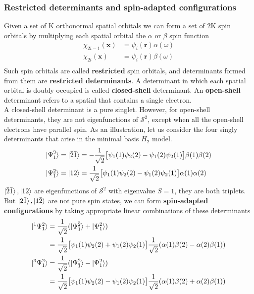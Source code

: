 \documentclass[11pt]{article}
\begin{document}
\subsubsection{Restricted determinants and spin-adapted configurations}
Given a set of K orthonormal spatial orbitals we can form a set of 2K spin orbitals by multiplying each spatial orbital the
$\alpha$ or $\beta$ spin function
\begin{equation}
    \begin{split}
        \chi_{2i-1}(\mathbf{x})&=\psi_i(\mathbf{r})\alpha(\omega)\\
        \chi_{2i}(\mathbf{x})&=\psi_i(\mathbf{r})\beta(\omega)\\
    \end{split}
\end{equation}
Such spin orbitals are called \textbf{restricted} spin orbitals, and determinants formed from them are \textbf{restricted determinants}.
A determinant in which each spatial orbital is doubly occupied is called \textbf{closed-shell} determinant. An \textbf{open-shell} determinant
refers to a spatial that contains a single electron.\\
A closed-shell determinant is a pure singlet. However, for open-shell determinants, they are not eigenfunctions of $\mathcal{S}^2$, except
when all the open-shell electrons have parallel spin. As an illustration, let us consider the four singly determinants that arise in the minimal
basis $H_2$ model.
\begin{align}
    \ket{\Psi_1^{\bar{2}}}&=\ket{\bar{2}\bar{1}}=-\frac{1}{\sqrt{2}}\big[\psi_1(1)\psi_2(2)-\psi_1(2)\psi_2(1)\big]\beta(1)\beta(2)\\
    \ket{\Psi_{\bar{1}}^2}&=\ket{1 2}=\frac{1}{\sqrt{2}}\big[\psi_1(1)\psi_2(2)-\psi_1(2)\psi_2(1)\big]\alpha(1)\alpha(2)\\
\end{align}
$\ket{\bar{2}\bar{1}}, \ket{1 2}$ are eigenfunctions of $\mathcal{S}^2$ with eigenvalue $S=1$, they are both triplets. But $\ket{2 \bar{1}}, \ket{1 \bar{2}}$
are not pure spin states, we can form \textbf{spin-adapted configurations} by taking appropriate linear combinations of these determinants
\begin{align}
    \ket{ ^1\Psi_1^2}&=\frac{1}{\sqrt{2}}(\ket{\Psi_{\bar{1}}^{\bar{2}}}+\ket{\Psi_1^2})\notag\\
    &=\frac{1}{\sqrt{2}}\big[\psi_1(1)\psi_2(2)+\psi_1(2)\psi_2(1)\big]\frac{1}{\sqrt{2}}(\alpha(1)\beta(2)-\alpha(2)\beta(1))\\
    \ket{ ^3\Psi_1^2}&=\frac{1}{\sqrt{2}}(\ket{\Psi_{\bar{1}}^{\bar{2}}}-\ket{\Psi_1^2})\notag\\
    &=\frac{1}{\sqrt{2}}\big[\psi_1(1)\psi_2(2)-\psi_1(2)\psi_2(1)\big]\frac{1}{\sqrt{2}}(\alpha(1)\beta(2)+\alpha(2)\beta(1))
\end{align}
\end{document}
